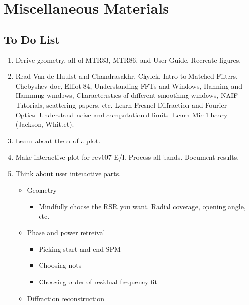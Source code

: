 \documentclass[crop=false,class=article,oneside]{standalone}
\begin{document}
    \ifx\ifphysicscourseselectromagnetismI\undefined
        \section*{Miscellaneous Materials}
        \setcounter{section}{1}
    \fi
    \subsection{To Do List}
        \begin{enumerate}
            \item Derive geometry, all of MTR83, MTR86, and User Guide. Recreate figures.
            \item Read Van de Huulst and Chandrasakhr, Chylek, Intro to Matched Filters,
                  Chebyshev doc, Elliot 84, Understanding FFTs and Windows,
                  Hanning and Hamming windows, Characteristics of different
                  smoothing windows, NAIF Tutorials, scattering papers, etc.
                  Learn Fresnel Diffraction and Fourier Optics. Understand noise
                  and computational limits. Learn Mie Theory (Jackson, Whittet).
            \item Learn about the $\alpha$ of a plot.
            \item Make interactive plot for rev007 E/I. Process all bands.
                  Document results.
            \item Think about user interactive parts.
            \begin{itemize}
                \item Geometry
                \begin{itemize}
                    \item Mindfully choose the RSR you want. Radial coverage, opening angle, etc.
                \end{itemize}
                \item Phase and power retreival
                \begin{itemize}
                    \item Picking start and end SPM
                    \item Choosing nots
                    \item Choosing order of residual frequency fit
                \end{itemize}
                \item Diffraction reconstruction
                \begin{itemize}

\end{itemize}
\end{itemize}
\end{enumerate}
\end{document}
